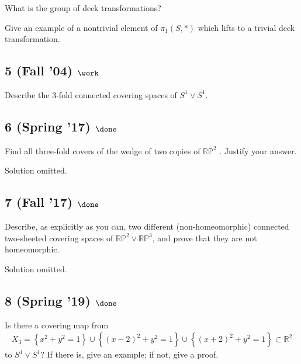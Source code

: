 What is the group of deck transformations?

Give an example of a nontrivial element of \(\pi_1 (S, \ast)\) which
lifts to a trivial deck transformation.

\hypertarget{fall-04-work-2}{%
\subsection{\texorpdfstring{5 (Fall '04)
\(\work\)}{5 (Fall '04) \textbackslash work}}\label{fall-04-work-2}}

Describe the 3-fold connected covering spaces of \(S^1 \lor S^1\).

\hypertarget{spring-17-done}{%
\subsection{\texorpdfstring{6 (Spring '17)
\(\done\)}{6 (Spring '17) \textbackslash done}}\label{spring-17-done}}

Find all three-fold covers of the wedge of two copies of
\({\mathbb{RP}}^2\) . Justify your answer.

Solution omitted.

\hypertarget{fall-17-done}{%
\subsection{\texorpdfstring{7 (Fall '17)
\(\done\)}{7 (Fall '17) \textbackslash done}}\label{fall-17-done}}

Describe, as explicitly as you can, two different (non-homeomorphic)
connected two-sheeted covering spaces of
\({\mathbb{RP}}^2 \lor {\mathbb{RP}}^3\), and prove that they are not
homeomorphic.


Solution omitted.

\hypertarget{spring-19-done}{%
\subsection{\texorpdfstring{8 (Spring '19)
\(\done\)}{8 (Spring '19) \textbackslash done}}\label{spring-19-done}}

Is there a covering map from
\begin{align*}
X_3 = \left\{{x^2 + y^2 = 1}\right\} \cup \left\{{(x - 2)^2 + y^2 = 1}\right\} \cup \left\{{(x + 2)^2 + y^2 = 1}\right\} \subset {\mathbb{R}}^2
\end{align*}
to \(S^1 \vee S^1\)? If there is, give an example; if not, give a proof.

